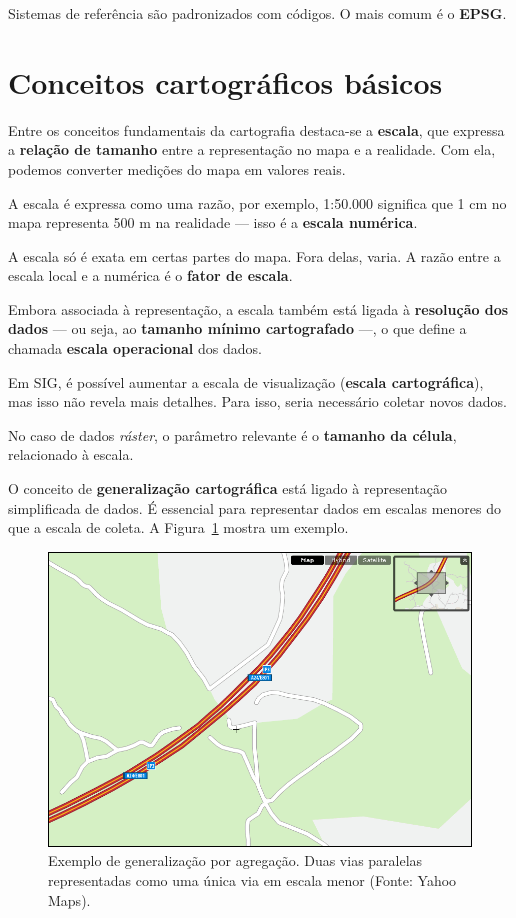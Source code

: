 Sistemas de referência são padronizados com códigos. O mais comum é o \textbf{EPSG}.

\section{Conceitos cartográficos básicos}

Entre os conceitos fundamentais da cartografia destaca-se a \textbf{escala}, que expressa a \textbf{relação de tamanho} entre a representação no mapa e a realidade. Com ela, podemos converter medições do mapa em valores reais.

A escala é expressa como uma razão, por exemplo, 1:50.000 significa que 1 cm no mapa representa 500 m na realidade — isso é a \textbf{escala numérica}.

A escala só é exata em certas partes do mapa. Fora delas, varia. A razão entre a escala local e a numérica é o \textbf{fator de escala}.

Embora associada à representação, a escala também está ligada à \textbf{resolução dos dados} — ou seja, ao \textbf{tamanho mínimo cartografado} —, o que define a chamada \textbf{escala operacional} dos dados.

Em SIG, é possível aumentar a escala de visualização (\textbf{escala cartográfica}), mas isso não revela mais detalhes. Para isso, seria necessário coletar novos dados.

No caso de dados \emph{ráster}, o parâmetro relevante é o \textbf{tamanho da célula}, relacionado à escala.

O conceito de \textbf{generalização cartográfica} está ligado à representação simplificada de dados. É essencial para representar dados em escalas menores do que a escala de coleta. A Figura~\ref{Fig:Generalizacion_agregacion} mostra um exemplo.

\begin{figure}[!hbt]
\centering
\includegraphics[width=.75\columnwidth]{Fundamentos_cartograficos/Generalizacion_agregacion.png}
\caption{\small Exemplo de generalização por agregação. Duas vias paralelas representadas como uma única via em escala menor (Fonte: Yahoo Maps).}
\label{Fig:Generalizacion_agregacion} 
\end{figure}

